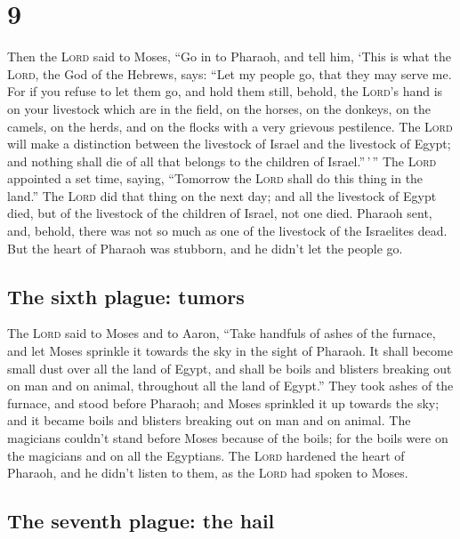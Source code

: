\hypertarget{section-8}{%
\section{9}\label{section-8}}

 Then the \textsc{Lord} said to Moses, ``Go in to Pharaoh,
and tell him, `This is what the \textsc{Lord}, the God of the Hebrews,
says: ``Let my people go, that they may serve me.  For if
you refuse to let them go, and hold them still,  behold,
the \textsc{Lord}'s hand is on your livestock which are in the field, on
the horses, on the donkeys, on the camels, on the herds, and on the
flocks with a very grievous pestilence.  The \textsc{Lord}
will make a distinction between the livestock of Israel and the
livestock of Egypt; and nothing shall die of all that belongs to the
children of Israel.''\,'\,''  The \textsc{Lord} appointed
a set time, saying, ``Tomorrow the \textsc{Lord} shall do this thing in
the land.''  The \textsc{Lord} did that thing on the next
day; and all the livestock of Egypt died, but of the livestock of the
children of Israel, not one died.  Pharaoh sent, and,
behold, there was not so much as one of the livestock of the Israelites
dead. But the heart of Pharaoh was stubborn, and he didn't let the
people go.

\hypertarget{the-sixth-plague-tumors}{%
\subsection{The sixth plague: tumors}\label{the-sixth-plague-tumors}}

 The \textsc{Lord} said to Moses and to Aaron, ``Take
handfuls of ashes of the furnace, and let Moses sprinkle it towards the
sky in the sight of Pharaoh.  It shall become small dust
over all the land of Egypt, and shall be boils and blisters breaking out
on man and on animal, throughout all the land of Egypt.''
 They took ashes of the furnace, and stood before
Pharaoh; and Moses sprinkled it up towards the sky; and it became boils
and blisters breaking out on man and on animal.  The
magicians couldn't stand before Moses because of the boils; for the
boils were on the magicians and on all the Egyptians. 
The \textsc{Lord} hardened the heart of Pharaoh, and he didn't listen to
them, as the \textsc{Lord} had spoken to Moses.

\hypertarget{the-seventh-plague-the-hail}{%
\subsection{The seventh plague: the
hail}\label{the-seventh-plague-the-hail}}

